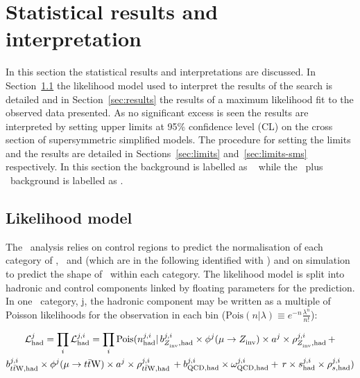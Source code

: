 \chapter{Statistical results and interpretation}
\label{cha:statisticalResults}

In this section the statistical results and interpretations are discussed.
In Section~\ref{sec:likelihood} the likelihood model used to interpret the results of the \alphat search is
detailed and in Section~\ref{sec:results} the results of a maximum likelihood fit to the observed data presented. 
As no significant excess is seen the results are interpreted by setting upper limits at 95\% confidence 
level (CL) on the cross section of supersymmetric simplified models. The procedure for setting the limits and 
the results are detailed in Sections~\ref{sec:limits} and~\ref{sec:limits-sms} respectively.
In this section the \znunu background is labelled as \zInv~ while 
the \ttj~plus \wj~background is labelled as \ttW.

\section{Likelihood model}
\label{sec:likelihood}

The \alphat~analysis relies on control regions to predict the normalisation of each category of \njet, \nb~and \scalht 
(which are in the following identified with \htcat) and on simulation to predict the shape 
of \mht~within each category. The likelihood model is split into hadronic and control components
linked by floating parameters for the prediction. In one \htcat~category, j, 
the hadronic component may be written as a multiple of Poisson likelihoods
for the observation in each \mht bin 
($\mathrm{Pois}(n|\lambda) \equiv e^{-n}\frac{\lambda^{n}}{n!}$):

\begin{multline}
\label{eq:hadronicLikelihood}
\mathcal{L}^{j}_{\mathrm{had}} = \prod_i \mathcal{L}^{j,i}_{\mathrm{had}} = \prod_i \mathrm{Pois}(n^{j,i}_{\mathrm{had}} |\, b^{j,i}_{Z_{\rm inv}^{~},\mathrm{had}}\times\phi^{j}(\mu\rightarrow Z_{\rm inv}^{~})\times a^{j}\times\rho^{j,i}_{Z_{\rm inv}^{~},\mathrm{had}}\, + \\ 
b^{j,i}_{t\bar{t}\text{W},\mathrm{had}}\times\phi^{j}(\mu\rightarrow t\bar{t}\text{W})\times a^{j}\times\rho^{j,i}_{t\bar{t}\text{W},\mathrm{had}}\, + b^{j,i}_{\text{QCD},\mathrm{had}}\times\omega^{j,i}_{\text{QCD},\mathrm{had}} + \,r\times s^{j,i}_{\mathrm{had}}\times\rho^{j,i}_{s,\mathrm{had}}) 
\end{multline}

